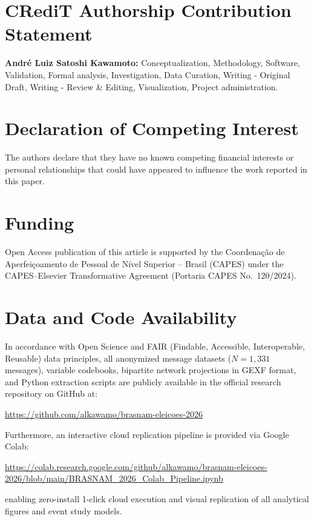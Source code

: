 \documentclass[preprint,12pt]{elsarticle}
\begin{document}
\section*{CRediT Authorship Contribution Statement}
\textbf{André Luiz Satoshi Kawamoto:} Conceptualization, Methodology, Software, Validation, Formal analysis, Investigation, Data Curation, Writing - Original Draft, Writing - Review \& Editing, Visualization, Project administration.

\section*{Declaration of Competing Interest}
The authors declare that they have no known competing financial interests or personal relationships that could have appeared to influence the work reported in this paper.

\section*{Funding}
Open Access publication of this article is supported by the Coordenação de Aperfeiçoamento de Pessoal de Nível Superior -- Brasil (CAPES) under the CAPES--Elsevier Transformative Agreement (Portaria CAPES No.\ 120/2024).

\section*{Data and Code Availability}
In accordance with Open Science and FAIR (Findable, Accessible, Interoperable, Reusable) data principles, all anonymized message datasets ($N=1,331$ messages), variable codebooks, bipartite network projections in GEXF format, and Python extraction scripts are publicly available in the official research repository on GitHub at:
\begin{center}
\url{https://github.com/alkawamo/brasnam-eleicoes-2026}
\end{center}
Furthermore, an interactive cloud replication pipeline is provided via Google Colab:
\begin{center}
\url{https://colab.research.google.com/github/alkawamo/brasnam-eleicoes-2026/blob/main/BRASNAM_2026_Colab_Pipeline.ipynb}
\end{center}
enabling zero-install 1-click cloud execution and visual replication of all analytical figures and event study models.



\end{document}
